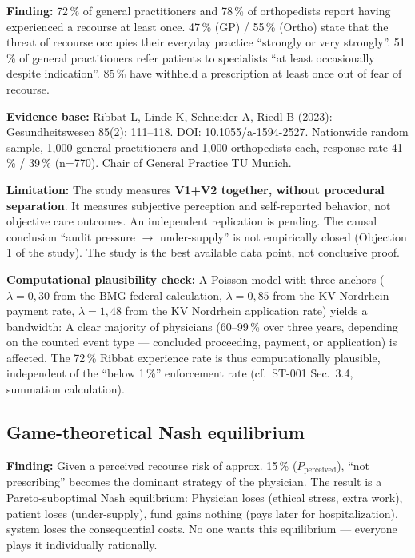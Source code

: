 \documentclass{umbruch-position}
\begin{document}
\textbf{Finding:} 72\,\% of general practitioners and 78\,\% of orthopedists report having experienced a recourse at least once. 47\,\% (GP) / 55\,\% (Ortho) state that the threat of recourse occupies their everyday practice ``strongly or very strongly''. 51\,\% of general practitioners refer patients to specialists ``at least occasionally despite indication''. 85\,\% have withheld a prescription at least once out of fear of recourse.

\textbf{Evidence base:} Ribbat L, Linde K, Schneider A, Riedl B (2023): Gesundheitswesen 85(2): 111--118. DOI: 10.1055/a-1594-2527. Nationwide random sample, 1,000 general practitioners and 1,000 orthopedists each, response rate 41\,\% / 39\,\% (n=770). Chair of General Practice TU Munich.

\textbf{Limitation:} The study measures \textbf{V1+V2 together, without procedural separation}. It measures subjective perception and self-reported behavior, not objective care outcomes. An independent replication is pending. The causal conclusion ``audit pressure $\to$ under-supply'' is not empirically closed (Objection 1 of the study). The study is the best available data point, not conclusive proof.

\textbf{Computational plausibility check:} A Poisson model with three anchors ($\lambda = 0{,}30$ from the BMG federal calculation, $\lambda = 0{,}85$ from the KV Nordrhein payment rate, $\lambda = 1{,}48$ from the KV Nordrhein application rate) yields a bandwidth: A clear majority of physicians (60--99\,\% over three years, depending on the counted event type --- concluded proceeding, payment, or application) is affected. The 72\,\% Ribbat experience rate is thus computationally plausible, independent of the ``below 1\,\%'' enforcement rate (cf.\ ST-001 Sec.~3.4, summation calculation).

\subsection{Game-theoretical Nash equilibrium}

\textbf{Finding:} Given a perceived recourse risk of approx. 15\,\% ($P_{\text{perceived}}$), ``not prescribing'' becomes the dominant strategy of the physician. The result is a Pareto-suboptimal Nash equilibrium: Physician loses (ethical stress, extra work), patient loses (under-supply), fund gains nothing (pays later for hospitalization), system loses the consequential costs. No one wants this equilibrium --- everyone plays it individually rationally.
\end{document}
